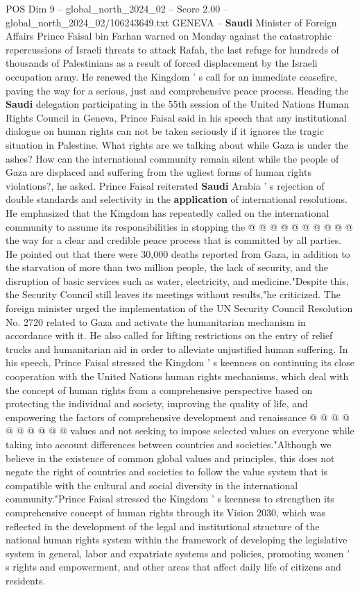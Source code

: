 \begin{textsample}{POS Dim 9 – global\_north\_2024\_02 – Score 2.00 – global\_north\_2024\_02/106243649.txt}  \label{ex:f9_pos_160}
GENEVA -- \textbf{Saudi} Minister of Foreign Affairs Prince Faisal bin Farhan warned on Monday against the catastrophic repercussions of Israeli threats to attack Rafah, the last refuge for hundreds of thousands of Palestinians as a result of forced displacement by the Israeli occupation army.
He renewed the Kingdom ' s call for an immediate ceasefire, paving the way for a serious, just and comprehensive peace process.
Heading the \textbf{Saudi} delegation participating in the 55th session of the United Nations Human Rights Council in Geneva, Prince Faisal said in his speech that any institutional dialogue on human rights can not be taken seriously if it ignores the tragic situation in Palestine.
What rights are we talking about while Gaza is under the ashes?
How can the international community remain silent while the people of Gaza are displaced and suffering from the ugliest forms of human rights violations?, he asked.
Prince Faisal reiterated \textbf{Saudi} Arabia ' s rejection of double standards and selectivity in the \textbf{application} of international resolutions.
He emphasized that the Kingdom has repeatedly called on the international community to assume its responsibilities in stopping the @ @ @ @ @ @ @ @ @ @ the way for a clear and credible peace process that is committed by all parties.
He pointed out that there were 30,000 deaths reported from Gaza, in addition to the starvation of more than two million people, the lack of security, and the disruption of basic services such as water, electricity, and medicine."Despite this, the Security Council still leaves its meetings without results,"he criticized.
The foreign minister urged the implementation of the UN Security Council Resolution No. 2720 related to Gaza and activate the humanitarian mechanism in accordance with it.
He also called for lifting restrictions on the entry of relief trucks and humanitarian aid in order to alleviate unjustified human suffering.
In his speech, Prince Faisal stressed the Kingdom ' s keenness on continuing its close cooperation with the United Nations human rights mechanisms, which deal with the concept of human rights from a comprehensive perspective based on protecting the individual and society, improving the quality of life, and empowering the factors of comprehensive development and renaissance @ @ @ @ @ @ @ @ @ @ values and not seeking to impose selected values on everyone while taking into account differences between countries and societies."Although we believe in the existence of common global values and principles, this does not negate the right of countries and societies to follow the value system that is compatible with the cultural and social diversity in the international community."Prince Faisal stressed the Kingdom ' s keenness to strengthen its comprehensive concept of human rights through its Vision 2030, which was reflected in the development of the legal and institutional structure of the national human rights system within the framework of developing the legislative system in general, labor and expatriate systems and policies, promoting women ' s rights and empowerment, and other areas that affect daily life of citizens and residents.

\end{textsample}
